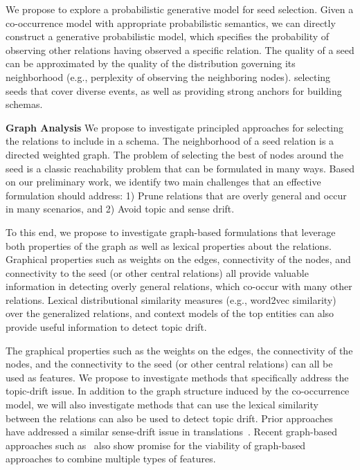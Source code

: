 We propose to explore a probabilistic generative model for seed selection. Given a co-occurrence model with appropriate probabilistic semantics, we can directly construct a generative probabilistic model, which specifies the probability of observing other relations having observed a specific relation. The quality of a seed can be approximated by the quality of the distribution governing its neighborhood (e.g., perplexity of observing the neighboring nodes). selecting seeds that cover diverse events, as well as providing strong anchors for building schemas. 

\textbf{Graph Analysis} 
We propose to investigate principled approaches for selecting the relations to include in a schema. 
The neighborhood of a seed relation is a directed weighted graph. The problem of selecting the best of nodes around the seed is a classic reachability problem that can be formulated in many ways.  Based on our preliminary work, we identify two main challenges that an effective formulation should address: 1) Prune relations that are overly general and occur in many scenarios, and 2) Avoid topic and sense drift.   

To this end, we propose to investigate graph-based formulations that leverage both properties of the graph as well as lexical properties about the relations. Graphical properties such as weights on the edges, connectivity of the nodes, and connectivity to the seed (or other central relations) all provide valuable information in detecting overly general relations, which co-occur with many other relations. Lexical distributional similarity measures (e.g., word2vec similarity) over the generalized relations, and context models of the top entities can also provide useful information to detect topic drift.  

The graphical properties such as the weights on the edges, the connectivity of the nodes, and the connectivity to the seed (or other central relations) can all be used as features.
We propose to investigate methods that specifically address the topic-drift issue. In addition to the graph structure induced by the co-occurrence model, we will also investigate methods that can use the lexical similarity between the relations can also be used to detect topic drift. Prior approaches have addressed a similar sense-drift issue in translations~\cite{soderland2010panlingual}. Recent graph-based approaches such as~\cite{lao2011random,gardner2013improving} also show promise for the viability of graph-based approaches to combine multiple types of features. 

